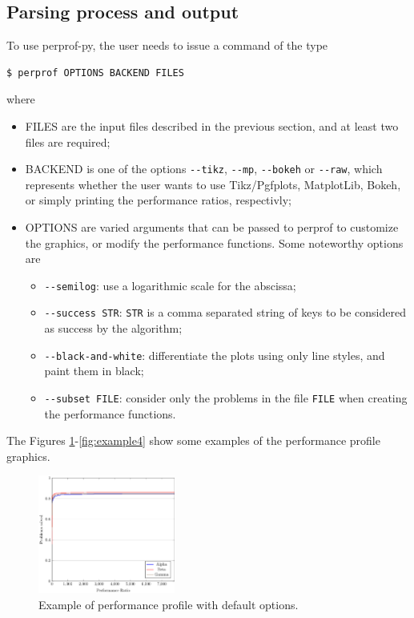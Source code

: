 \subsection*{Parsing process and output}

    To use perprof-py, the user needs to issue a command of the type
\begin{verbatim}
$ perprof OPTIONS BACKEND FILES
\end{verbatim}
    where
    \begin{itemize}
      \item FILES are the input files described in the previous section, and at
        least two files are required;
      \item BACKEND is one of the options \verb+--tikz+, \verb+--mp+,
        \verb+--bokeh+ or
        \verb+--raw+, which represents whether the user wants to use
        Tikz/Pgfplots, MatplotLib, Bokeh, or simply printing the performance
        ratios, respectivly;
      \item OPTIONS are varied arguments that can be passed to perprof to
        customize the graphics, or modify the performance functions. Some
        noteworthy options are
        \begin{itemize}
          \item \verb+--semilog+: use a logarithmic scale for the abscissa;
          \item \verb+--success STR+: \verb+STR+ is a comma separated string
            of keys to be considered as success by the algorithm;
          \item \verb+--black-and-white+: differentiate the plots using only
            line styles, and paint them in black;
          \item \verb+--subset FILE+: consider only the problems in the file
            \verb+FILE+ when creating the performance functions.
        \end{itemize}
    \end{itemize}
    The Figures \ref{fig:example1}-\ref{fig:example4} show some examples of the
    performance profile graphics.
    \begin{figure}[!ht]
      \centering
      \includegraphics[width=0.4\textwidth]{plots/abc.pdf}
      \caption{Example of performance profile with default options.}
      \label{fig:example1}
    \end{figure}
